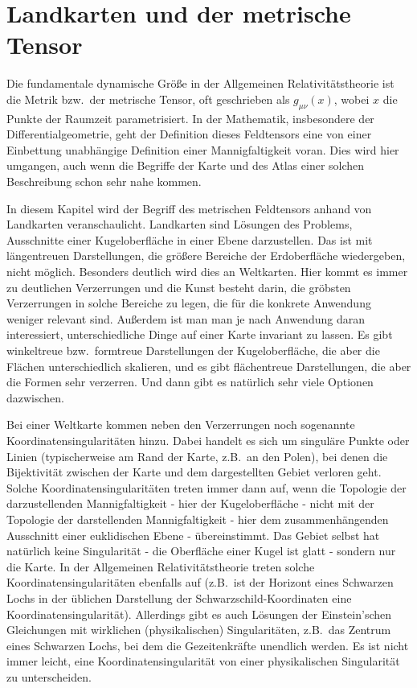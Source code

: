 

\chapter{Landkarten und der metrische Tensor}
\label{chap_Landkarte}

Die fundamentale dynamische Gr\"o\ss e in der Allgemeinen Relativit\"atstheorie
ist die Metrik bzw.\ der metrische Tensor, oft geschrieben als $g_{\mu \nu}(x)$, wobei
$x$ die Punkte der Raumzeit parametrisiert. 
In der Mathematik, insbesondere der Differentialgeometrie, geht der
Definition dieses Feldtensors
eine von einer Einbettung unabh\"angige Definition einer Mannigfaltigkeit voran.
Dies wird hier umgangen, auch wenn die Begriffe der Karte und des Atlas einer
solchen Beschreibung schon sehr nahe kommen.  

In diesem Kapitel wird der Begriff des metrischen Feldtensors anhand von Landkarten
veranschaulicht. Landkarten sind L\"osungen des Problems, Ausschnitte einer Kugeloberfl\"ache
in einer Ebene darzustellen. Das ist mit l\"angentreuen Darstellungen, die gr\"o\ss ere Bereiche der
Erdoberfl\"ache wiedergeben, nicht m\"oglich. Besonders deutlich wird dies an Weltkarten. 
Hier kommt es immer zu deutlichen Verzerrungen und die Kunst besteht darin, die gr\"obsten Verzerrungen
in solche Bereiche zu legen, die f\"ur die konkrete Anwendung weniger relevant sind. Au\ss erdem ist man
man je nach Anwendung daran interessiert, unterschiedliche Dinge auf einer Karte
invariant zu lassen. Es gibt winkeltreue bzw.\ formtreue Darstellungen der Kugeloberfl\"ache, die
aber die Fl\"achen unterschiedlich skalieren, und es gibt fl\"achentreue Darstellungen, die
aber die Formen sehr verzerren. Und dann gibt es nat\"urlich sehr viele Optionen
dazwischen. 

Bei einer Weltkarte kommen neben den Verzerrungen noch sogenannte Koordinatensingularit\"aten
hinzu. 
Dabei handelt es sich um singul\"are Punkte oder Linien (typischerweise am Rand der
Karte, z.B.\ an den Polen), bei denen die Bijektivit\"at zwischen der Karte und dem dargestellten
Gebiet verloren geht. Solche Koordinatensingularit\"aten treten immer dann auf, wenn die
Topologie der darzustellenden Mannigfaltigkeit - hier der Kugeloberfl\"ache - nicht mit der 
Topologie der darstellenden Mannigfaltigkeit - hier dem zusammenh\"angenden Ausschnitt einer euklidischen
Ebene - \"ubereinstimmt. Das Gebiet selbst hat nat\"urlich keine Singularit\"at - die Oberfl\"ache einer
Kugel ist glatt - sondern nur die Karte. In der Allgemeinen Relativit\"atstheorie treten solche
Koordinatensingularit\"aten ebenfalls auf (z.B.\ ist der Horizont eines Schwarzen Lochs in der
\"ublichen Darstellung der Schwarzschild-Koordinaten eine Koordinatensingularit\"at). Allerdings
gibt es auch L\"osungen der Einstein'schen Gleichungen mit wirklichen (physikalischen) Singularit\"aten,
z.B.\ das Zentrum eines Schwarzen Lochs, bei dem die Gezeitenkr\"afte unendlich werden. Es ist
nicht immer leicht, eine Koordinatensingularit\"at von einer physikalischen Singularit\"at zu unterscheiden.

